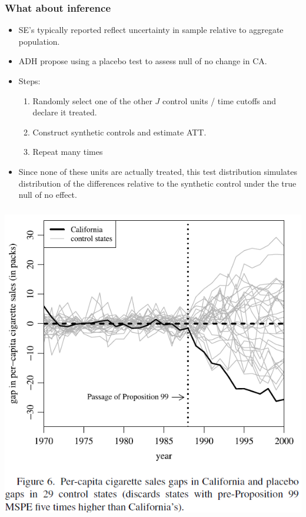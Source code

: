 \begin{frame}
  \frametitle{What about inference}
  \begin{itemize}
    \item SE's typically reported reflect uncertainty in sample relative to aggregate population. 
    \item ADH propose using a placebo test to assess null of no change in CA.
    \item Steps:
      \begin{enumerate}
        \item Randomly select one of the other $J$ control units / time cutoffs and declare it treated. 
        \item Construct synthetic controls and estimate ATT. 
        \item Repeat many times
      \end{enumerate}
    \item Since none of these units are actually treated, this test distribution simulates distribution of the differences relative to the synthetic control under the true null of no effect. 
  \end{itemize}
\end{frame}

\begin{frame}
  \frametitle{}
  \begin{center}
    \includegraphics[width=.85\textwidth]{./resources/ADHPlacebo}
  \end{center}  
\end{frame}

